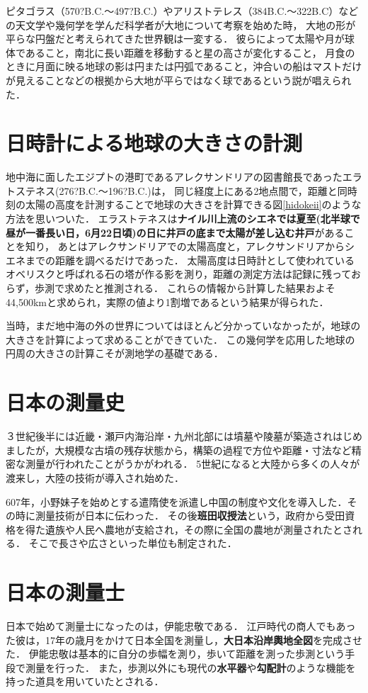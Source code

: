 \documentclass[titlepage]{jarticle}
\begin{document}
ピタゴラス（570?B.C.～497?B.C.）やアリストテレス（384B.C.～322B.C）などの天文学や幾何学を学んだ科学者が大地について考察を始めた時，
大地の形が平らな円盤だと考えられてきた世界観は一変する．
彼らによって太陽や月が球体であること，南北に長い距離を移動すると星の高さが変化すること，
月食のときに月面に映る地球の影は円または円弧であること，沖合いの船はマストだけが見えることなどの根拠から大地が平らではなく球であるという説が唱えられた．

\section{日時計による地球の大きさの計測}
地中海に面したエジプトの港町であるアレクサンドリアの図書館長であったエラトステネス(276?B.C.～196?B.C.)は，
同じ経度上にある2地点間で，距離と同時刻の太陽の高度を計測することで地球の大きさを計算できる図\ref{hidokeii}のような方法を思いついた．
エラストテネスは\textbf{ナイル川上流のシエネでは夏至(北半球で昼が一番長い日，6月22日頃)の日に井戸の底まで太陽が差し込む井戸}があることを知り，
あとはアレクサンドリアでの太陽高度と，アレクサンドリアからシエネまでの距離を調べるだけであった．
太陽高度は日時計として使われているオベリスクと呼ばれる石の塔が作る影を測り，距離の測定方法は記録に残っておらず，歩測で求めたと推測される．
これらの情報から計算した結果およそ44,500kmと求められ，実際の値より1割増であるという結果が得られた．

当時，まだ地中海の外の世界についてはほとんど分かっていなかったが，地球の大きさを計算によって求めることができていた．
この幾何学を応用した地球の円周の大きさの計算こそが測地学の基礎である．

\section{日本の測量史}
３世紀後半には近畿・瀬戸内海沿岸・九州北部には墳墓や陵墓が築造されはじめましたが，大規模な古墳の残存状態から，構築の過程で方位や距離・寸法など精密な測量が行われたことがうかがわれる．
5世紀になると大陸から多くの人々が渡来し，大陸の技術が導入され始めた．

607年，小野妹子を始めとする遣隋使を派遣し中国の制度や文化を導入した．その時に測量技術が日本に伝わった．
その後\textbf{班田収授法}という，政府から受田資格を得た遺族や人民へ農地が支給され，その際に全国の農地が測量されたとされる．
そこで長さや広さといった単位も制定された．

\section{日本の測量士}
日本で始めて測量士になったのは，伊能忠敬である．
江戸時代の商人でもあった彼は，17年の歳月をかけて日本全国を測量し，\textbf{大日本沿岸輿地全図}を完成させた．
伊能忠敬は基本的に自分の歩幅を測り，歩いて距離を測った歩測という手段で測量を行った．
また，歩測以外にも現代の\textbf{水平器}や\textbf{勾配計}のような機能を持った道具を用いていたとされる．
\end{document}
